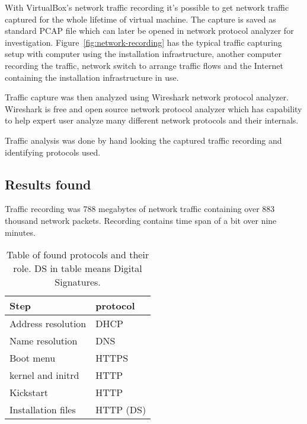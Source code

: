 With VirtualBox's network traffic recording it's possible to get
network traffic captured for the whole lifetime of virtual
machine. The capture is saved as standard PCAP file which can later be
opened in network protocol analyzer for
investigation. Figure~\ref{fig:network-recording} has the typical
traffic capturing setup with computer using the installation
infrastructure, another computer recording the traffic, network switch
to arrange traffic flows and the Internet containing the installation
infrastructure in use.

Traffic capture was then analyzed using Wireshark network protocol
analyzer. Wireshark is free and open source network protocol analyzer
which has capability to help expert user analyze many different
network protocols and their internals.

Traffic analysis was done by hand looking the captured traffic
recording and identifying protocols used.

\subsection{Results found}

Traffic recording was 788 megabytes of network traffic containing over
883 thousand network packets. Recording contains time span of a bit
over nine minutes.

\begin{table}[!ht]
  \def\arraystretch{1.1}%
  \begin{center}
    \begin{tabular}{| l | l |}
      \hline
      Step               & protocol    \\
      \hline
      Address resolution & DHCP        \\
      Name resolution    & DNS         \\
      Boot menu          & HTTPS       \\
      kernel and initrd  & HTTP        \\
      Kickstart          & HTTP        \\
      Installation files & HTTP (DS)   \\
      \hline
    \end{tabular}
    \caption{Table of found protocols and their role. DS in table
      means Digital Signatures.\label{tab:found_protocols_table}}
  \end{center}
\end{table}

